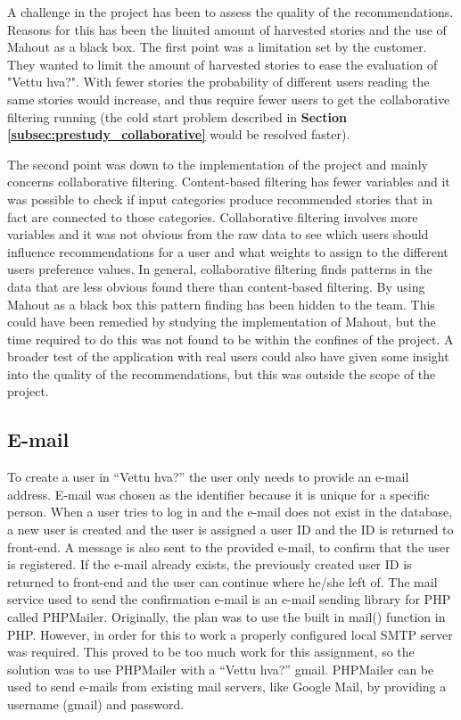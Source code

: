 A challenge in the project has been to assess the quality of the recommendations. Reasons for this has been the limited amount of harvested stories and the use of Mahout as a black box. The first point was a limitation set by the customer. They wanted to limit the amount of harvested stories to ease the evaluation of "Vettu hva?". With fewer stories the probability of different users reading the same stories would increase, and thus require fewer users to get the collaborative filtering running (the cold start problem described in \textbf{Section \ref{subsec:prestudy_collaborative}} would be resolved faster). \newline

The second point was down to the implementation of the project and mainly concerns collaborative filtering. Content-based filtering has fewer variables and it was possible to check if input categories produce recommended stories that in fact are connected to those categories. Collaborative filtering involves more variables and it was not obvious from the raw data to see which users should influence recommendations for a user and what weights to assign to the different users preference values. In general, collaborative filtering finds patterns in the data that are less obvious found there than content-based filtering. By using Mahout as a black box this pattern finding has been hidden to the team. This could have been remedied by studying the implementation of Mahout, but the time required to do this was not found to be within the confines of the project. A broader test of the application with real users could also have given some insight into the quality of the recommendations, but this was outside the scope of the project. \newline

\subsection{E-mail}

To create a user in “Vettu hva?” the user only needs to provide an e-mail address. E-mail was chosen as the identifier because it is unique for a specific person. When a user tries to log in and the e-mail does not exist in the database, a new user is created and the user is assigned a user ID and the ID is returned to front-end. A message is also sent to the provided e-mail, to confirm that the user is registered. If the e-mail already exists, the previously created user ID is returned to front-end and the user can continue where he/she left of. The mail service used to send the confirmation e-mail is an e-mail sending library for PHP called PHPMailer. Originally, the plan was to use the built in mail() function in PHP. However, in order for this to work a properly configured local SMTP server was required. This proved to be too much work for this assignment, so the solution was to use PHPMailer with a “Vettu hva?” gmail. PHPMailer can be used to send e-mails from existing mail servers, like Google Mail, by providing a username (gmail) and password.

\cleardoublepage